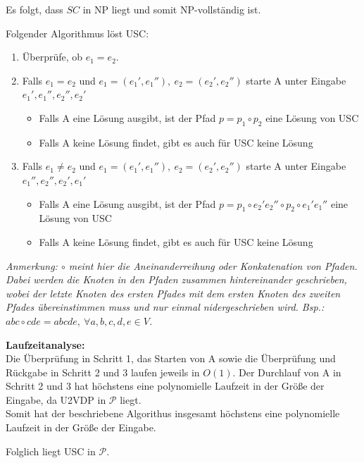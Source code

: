 \begin{teile}
	Es folgt, dass $SC$ in NP liegt und somit NP-vollständig ist.

	\item 
	Folgender Algorithmus löst USC:
	\begin{enumerate}
		\item Überprüfe, ob $e_1 = e_2$.
		\item Falls $e_1 = e_2$ und $e_1=(e_1',e_1''),\ e_2=(e_2',e_2'')$ starte A unter Eingabe $e_1',e_1'',e_2'',e_2'$ \begin{itemize}
			\item Falls A eine Lösung ausgibt, ist der Pfad $p=p_1\circ p_2$ eine Lösung von USC
			\item Falls A keine Lösung findet, gibt es auch für USC keine Lösung
		\end{itemize}
		\item Falls $e_1 \neq  e_2$ und $e_1=(e_1',e_1''),\ e_2=(e_2',e_2'')$ starte A unter Eingabe $e_1'',e_2'',e_2',e_1'$ \begin{itemize}
			\item Falls A eine Lösung ausgibt, ist der Pfad $p=p_1\circ e_2'e_2''\circ p_2\circ e_1'e_1''$ eine Lösung von USC
			\item Falls A keine Lösung findet, gibt es auch für USC keine Lösung
		\end{itemize}
	\end{enumerate}
	\textit{Anmerkung: $\circ $ meint hier die Aneinanderreihung oder Konkatenation von Pfaden. Dabei werden die Knoten in den Pfaden zusammen hintereinander geschrieben, wobei der letzte Knoten des ersten Pfades mit dem ersten Knoten des zweiten Pfades übereinstimmen muss und nur einmal nidergeschrieben wird. Bsp.: $abc\circ cde=abcde,\ \forall a,b,c,d,e \in V$.}

	\textbf{Laufzeitanalyse:}\\
	Die Überprüfung in Schritt 1, das Starten von A sowie die Überprüfung und Rückgabe in Schritt 2 und 3 laufen jeweils in $O(1)$. Der Durchlauf von A in Schritt 2 und 3 hat höchstens eine polynomielle Laufzeit in der Größe der Eingabe, da U2VDP in $\mathcal{P}$ liegt.\\
	Somit hat der beschriebene Algorithus insgesamt höchstens eine polynomielle Laufzeit in der Größe der Eingabe.

	Folglich liegt USC in $\mathcal{P}$.

\end{teile}
